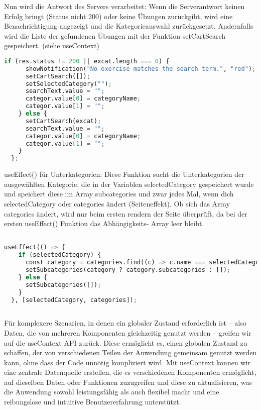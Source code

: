 \documentclass[12pt,a4paper]{article} %
\begin{document}
Nun wird die Antwort des Servers verarbeitet: Wenn die Serverantwort keinen Erfolg bringt (Status nicht 200) oder keine Übungen zurückgibt, wird eine Benachrichtigung angezeigt und die Kategorieauswahl zurückgesetzt. Andernfalls wird die Liste der gefundenen Übungen mit der Funktion setCartSearch gespeichert. (siehe useContext)


\begin{lstlisting}[language=Python]
    if (res.status != 200 || excat.length === 0) {
      showNotification("No exercise matches the search term.", "red");
      setCartSearch([]);
      setSelectedCategory("");
      searchText.value = "";
      categor.value[0] = categoryName;
      categor.value[1] = "";
    } else {
      setCartSearch(excat);
      searchText.value = "";
      categor.value[0] = categoryName;
      categor.value[1] = "";
    }
  };


\end{lstlisting}



useEffect() für Unterkategorien: Diese Funktion sucht die Unterkategorien der ausgewählten Kategorie, die in der Variablen selectedCategory gespeichert wurde und speichert diese im Array subcategories und zwar jedes Mal, wenn dich selectedCategory oder categories ändert (Seiteneffekt). Ob sich das Array categories ändert, wird nur beim ersten rendern der Seite überprüft, da bei der ersten useEffect() Funktion das Abhängigkeits- Array leer bleibt.


\begin{lstlisting}[language=Python]

useEffect(() => {
    if (selectedCategory) {
      const category = categories.find((c) => c.name === selectedCategory);
      setSubcategories(category ? category.subcategories : []);
    } else {
      setSubcategories([]);
    }
  }, [selectedCategory, categories]);
      
\end{lstlisting}



Für komplexere Szenarien, in denen ein globaler Zustand erforderlich ist – also Daten, die von mehreren Komponenten gleichzeitig genutzt werden – greifen wir auf die useContext API zurück. Diese ermöglicht es, einen globalen Zustand zu schaffen, der von verschiedenen Teilen der Anwendung gemeinsam genutzt werden kann, ohne dass der Code unnötig kompliziert wird. Mit useContext können wir eine zentrale Datenquelle erstellen, die es verschiedenen Komponenten ermöglicht, auf dieselben Daten oder Funktionen zuzugreifen und diese zu aktualisieren, was die Anwendung sowohl leistungsfähig als auch flexibel macht und eine reibungslose und intuitive Benutzererfahrung unterstützt.
\end{document}

